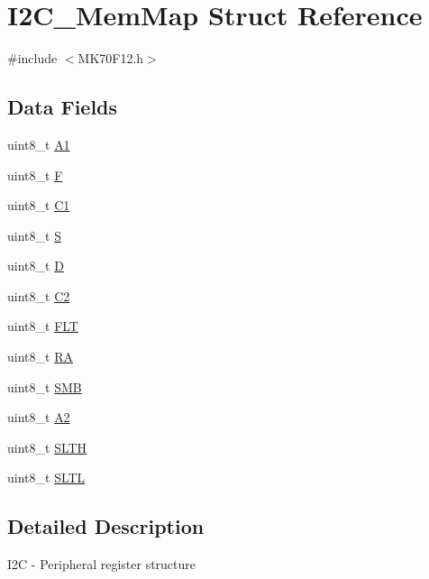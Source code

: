 \hypertarget{struct_i2_c___mem_map}{}\section{I2\+C\+\_\+\+Mem\+Map Struct Reference}
\label{struct_i2_c___mem_map}


{\ttfamily \#include $<$M\+K70\+F12.\+h$>$}

\subsection*{Data Fields}
\begin{DoxyCompactItemize}
\item 
uint8\+\_\+t \hyperlink{struct_i2_c___mem_map_aefc602e5555ff9807f66ba8d67c214c0}{A1}
\item 
uint8\+\_\+t \hyperlink{struct_i2_c___mem_map_a9f07a2e505dda38873798958a6c9f432}{F}
\item 
uint8\+\_\+t \hyperlink{struct_i2_c___mem_map_a211af10ff66759da8bd2712f3d26ad8a}{C1}
\item 
uint8\+\_\+t \hyperlink{struct_i2_c___mem_map_acba6223219d3887b1ba085cf199bf84a}{S}
\item 
uint8\+\_\+t \hyperlink{struct_i2_c___mem_map_a44f0a2e82a172b16e1241939185790cf}{D}
\item 
uint8\+\_\+t \hyperlink{struct_i2_c___mem_map_a5e8189de70defa55b4d4d50e42ac88d1}{C2}
\item 
uint8\+\_\+t \hyperlink{struct_i2_c___mem_map_a6520708827670dc2938e6cdec0264763}{F\+L\+T}
\item 
uint8\+\_\+t \hyperlink{struct_i2_c___mem_map_a9f17398ec3278c30924dd797dea9788a}{R\+A}
\item 
uint8\+\_\+t \hyperlink{struct_i2_c___mem_map_a14ca29af4960a6588080acb71f62d5fa}{S\+M\+B}
\item 
uint8\+\_\+t \hyperlink{struct_i2_c___mem_map_ad4e4dbcd884a2b52af7dbef17817f12e}{A2}
\item 
uint8\+\_\+t \hyperlink{struct_i2_c___mem_map_aac56d4be80ad622d7bf85bdd8c29504c}{S\+L\+T\+H}
\item 
uint8\+\_\+t \hyperlink{struct_i2_c___mem_map_afd5aa3cef3245893addeb55556e1ceff}{S\+L\+T\+L}
\end{DoxyCompactItemize}


\subsection{Detailed Description}
I2\+C -\/ Peripheral register structure 

